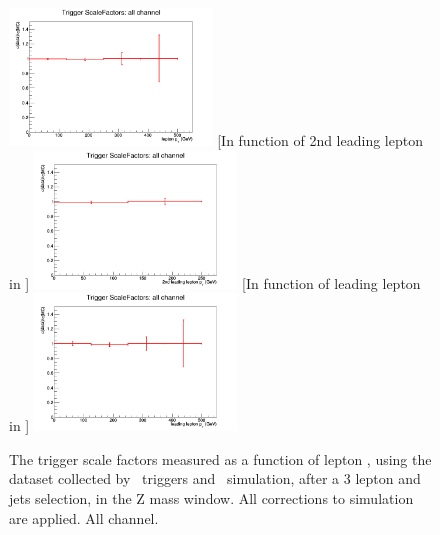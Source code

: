 \begin{figure}[tb]
	[In function of lepton \pt]{
		\includegraphics[width=0.48\textwidth]{Appendix/Figures/trigger/ScaleFactors/all/SF_trigger_allhistPt.png}
		\label{image:allhistPt.png}
	}
	[In function of 2nd leading lepton in \pt]{
		\includegraphics[width=0.48\textwidth]{Appendix/Figures/trigger/ScaleFactors/all/SF_trigger_allhistPt_2ndleadinglep.png}
		\label{image:allhistPt_2ndleadinglep.png}
	}
	[In function of leading lepton in \pt]{
		\includegraphics[width=0.48\textwidth]{Appendix/Figures/trigger/ScaleFactors/all/SF_trigger_allhistPt_leadinglep.png}
		\label{image:allhistPt_leadinglep.png}
	}
	\caption{The trigger scale factors measured as a function of lepton \pt, using the dataset collected by \Etmis\ triggers and \WZ\ simulation, after a 3 lepton and jets selection, in the Z mass window. All corrections to simulation are applied. All channel.}
	\label{image:FigurestriggerScaleFactorsall}
\end{figure}



